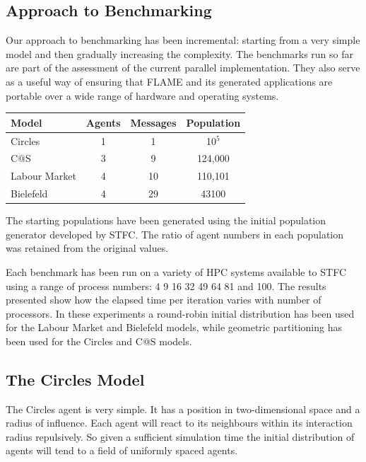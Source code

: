 \subsection{Approach to Benchmarking}
\label{sec:benchmarks}
Our approach to benchmarking has been incremental: starting from a very simple model and then gradually increasing the complexity. The benchmarks run so far are part of the assessment of the current parallel implementation. They also serve as a useful way of ensuring that FLAME and its generated applications are portable over a wide range of hardware and operating systems. 

\begin{table}[ht]
 \centering
  \begin{tabular}{l|ccc}
  Model     & Agents & Messages & Population   \\\hline
  Circles     &   1    &   1      &  10$^5$    \\
  C@S       &   3    &   9      &  124,000 \\
  Labour Market &   4    &   10     &  110,101 \\ 
  Bielefeld     &   4    &   29     &  43100     \\\hline
  \end{tabular}
\end{table}

The starting populations have been generated using the initial population generator developed by STFC. The ratio of agent numbers in each population was retained from the original values.

Each benchmark has been run on a variety of HPC systems available to STFC using a range of process numbers: 4 9 16 32 49 64 81 and 100. The results presented show how the elapsed time per iteration varies with number of processors. In these experiments a round-robin initial distribution has been used for the Labour Market and Bielefeld models, while geometric partitioning has been used for the Circles and C@S models.

\subsection{The Circles Model}
The Circles agent is very simple. It has a position in two-dimensional space and a radius of influence. Each agent will react to its neighbours within its interaction radius repulsively. So given a sufficient simulation time the initial distribution of agents will tend to a field of uniformly spaced agents.

